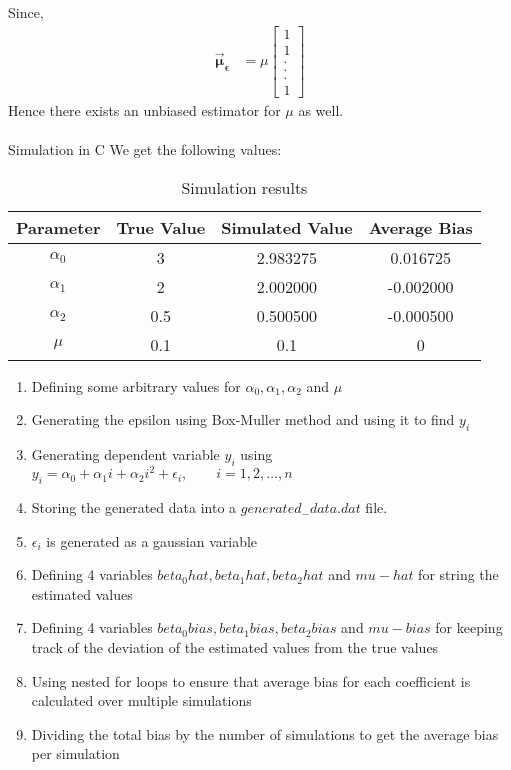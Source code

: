 \documentclass[journal,12pt,onecolumn]{IEEEtran}
\theoremstyle{remark}
\begin{document}
Since,
\begin{align}
\vec{\boldsymbol{\mu}}_{\boldsymbol{{\epsilon}}}&=\mu \begin{bmatrix}
1 \\%
1 \\%
. \\[-10pt]
. \\[-10pt]
. \\[5pt]
1
\end{bmatrix}
\end{align}
Hence there exists an unbiased estimator for $\mu$ as well.
\\
\\
Simulation in C
We get the following values:\\
\begin{table}[h!]
 \begin{center}
    \begin{tabular}{|c|c|c|c|}
    \hline
    Parameter & True Value & Simulated Value & Average Bias\\
    \hline
    $\alpha_0$ & 3 & 2.983275 & 0.016725\\
    \hline
    $\alpha_1$ & 2 & 2.002000 & -0.002000\\
    \hline
    $\alpha_2$ & 0.5 & 0.500500 & -0.000500\\
    \hline
    $\mu$ & 0.1 & 0.1 & 0\\
    \hline
    \end{tabular}
    \end{center}
    \caption{Simulation results}
    \label{table:1}
\end{table}
\begin{enumerate}
\item {Defining some arbitrary values for ${\alpha}_0, {\alpha}_1, {\alpha}_2$ and $\mu$}
\item {Generating the epsilon using Box-Muller method and using it to find $y_i$}
\item {Generating dependent variable $y_i$ using $y_i={\alpha}_0+{\alpha}_1i+{\alpha}_2i^2+\epsilon_{i}, \qquad i = 1,2,…,n$}
\item {Storing the generated data into a $generated_{-}data.dat$ file.}
\item {$\epsilon_{i}$ is generated as a gaussian variable	}
\item {Defining 4 variables $beta_0hat, beta_1hat, beta_2hat$ and $mu-hat$ for string the estimated values}
\item {Defining 4 variables $beta_0bias, beta_1bias, beta_2bias$ and $mu-bias$ for keeping track of the deviation of the estimated values from the true values}
\item {Using nested for loops to ensure that average bias for each coefficient is calculated over multiple simulations}
\item {Dividing the total bias by the number of simulations to get the average bias per simulation}
\end{enumerate}
\end{document}
